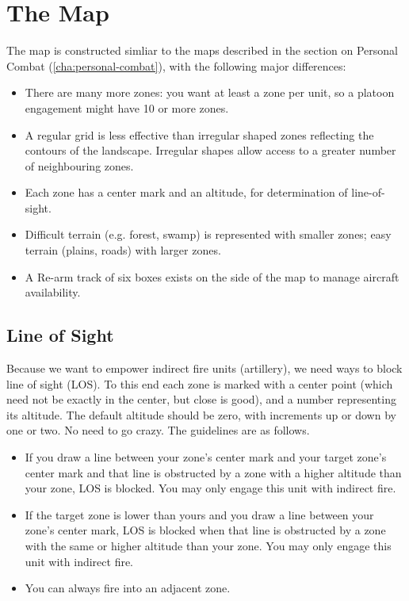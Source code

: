 \section{The Map}\label{sec:platoon-combat-map}

The map is constructed simliar to the maps described in the section on Personal Combat (\autoref{cha:personal-combat}), with the following major differences:

\begin{itemize}
\item
There are many more zones: you want at least a zone per unit, so a platoon engagement might have 10 or more zones.

\item
A regular grid is less effective than irregular shaped zones reflecting the contours of the landscape. Irregular shapes allow access to a greater number of neighbouring zones.

\item
Each zone has a center mark and an altitude, for determination of line-of-sight.

\item
Difficult terrain (e.g. forest, swamp) is represented with smaller zones; easy terrain (plains, roads) with larger zones.

\item
A Re-arm track of six boxes exists on the side of the map to manage aircraft availability.
\end{itemize}



\subsection{Line of Sight}\label{sec:line-of-sight}

Because we want to empower indirect fire units (artillery), we need ways to block line of sight (LOS). To this end each zone is marked with a center point (which need not be exactly in the center, but close is good), and a number representing its altitude. The default altitude should be zero, with increments up or down by one or two. No need to go crazy. The guidelines are as follows.

\begin{itemize}
\item
If you draw a line between your zone's center mark and your target zone's center mark and that line is obstructed by a zone with a higher altitude than your zone, LOS is blocked. You may only engage this unit with indirect fire.

\item
If the target zone is lower than yours and you draw a line between your zone's center mark, LOS is blocked when that line is obstructed by a zone with the same or higher altitude than your zone. You may only engage this unit with indirect fire.
\vfil
\item
You can always fire into an adjacent zone.
\end{itemize}

